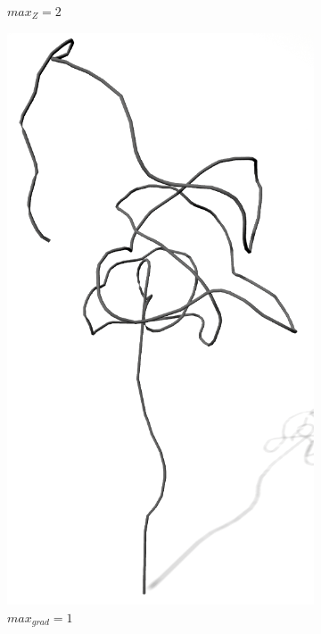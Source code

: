 \begin{figure} [hbtp]
\begin{subfigure}[t]{.45\textwidth}
		\caption{$max_Z = 2$}
		\label{subfig:SCA_Sonst_Zweigtiefe}
	\end{subfigure}
	\begin{subfigure}[t]{.45\textwidth}
		\centering
		\includegraphics[height=.21\textheight]{images/SCA_Sonst_Grad.png}
		\caption{$max_{grad} = 1$}
		\label{subfig:SCA_Sonst_Grad}
	\end{subfigure}
	\begin{subfigure}[t]{.45\textwidth}

\end{subfigure}
\end{figure}
